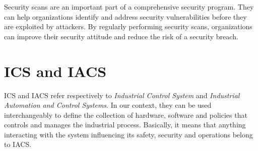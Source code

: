 Security scans are an important part of a comprehensive security program. They can help organizations identify and address security vulnerabilities before they are exploited by attackers. By regularly performing security scans, organizations can improve their security attitude and reduce the risk of a security breach.

\section{ICS and IACS}

ICS and IACS refer respectively to \textit{Industrial Control System} and \textit{Industrial Automation and Control Systems}. In our context, they can be used interchangeably to define the collection of hardware, software and policies that controls and manages the industrial process. Basically, it means that anything interacting with the system influencing its safety, security and operations belong to IACS.~\cite{ics-or-iacs}

